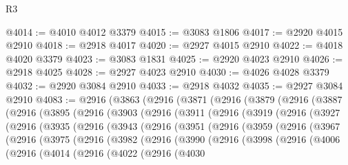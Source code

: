 \begin{lexlean}{R3}
\begin{coremodule}
@4014 := @4010 @4012 @3379
@4015 := @3083 @1806
@4017 := @2920 @4015 @2910
@4018 := @2918 @4017
@4020 := @2927 @4015 @2910
@4022 := @4018 @4020 @3379
@4023 := @3083 @1831
@4025 := @2920 @4023 @2910
@4026 := @2918 @4025
@4028 := @2927 @4023 @2910
@4030 := @4026 @4028 @3379
@4032 := @2920 @3084 @2910
@4033 := @2918 @4032
@4035 := @2927 @3084 @2910
@4083 := @2916
    (@3863
      (@2916
        (@3871
          (@2916
            (@3879
              (@2916
                (@3887
                  (@2916
                    (@3895
                      (@2916
                        (@3903
                          (@2916
                            (@3911
                              (@2916
                                (@3919
                                  (@2916
                                    (@3927
                                      (@2916
                                        (@3935
                                          (@2916
                                            (@3943
                                              (@2916
                                                (@3951
                                                  (@2916
                                                    (@3959
                                                      (@2916
                                                        (@3967
                                                          (@2916
                                                            (@3975
                                                              (@2916
                                                                (@3982
                                                                  (@2916
                                                                    (@3990
                                                                      (@2916
                                                                        (@3998
                                                                          (@2916
                                                                            (@4006
                                                                              (@2916
                                                                                (@4014
                                                                                  (@2916
                                                                                    (@4022
                                                                                      (@2916
                                                                                        (@4030

\end{coremodule}
\end{lexlean}

